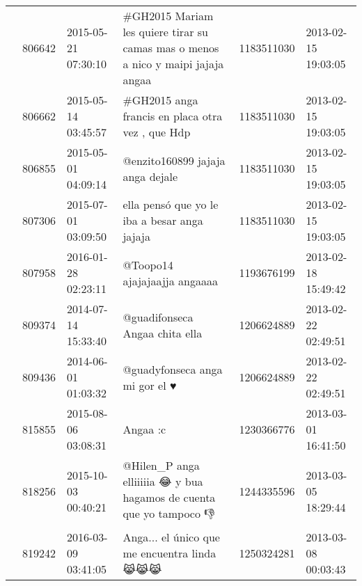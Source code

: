 \begin{tabular}{llllrl}
           & 806642  & 2015-05-21 07:30:10 &                                                             \#GH2015 Mariam les quiere tirar su camas mas o menos a nico y maipi jajaja angaa &  1183511030 & 2013-02-15 19:03:05 \\
           & 806662  & 2015-05-14 03:45:57 &                                                                                             \#GH2015 anga francis en placa otra vez , que Hdp &  1183511030 & 2013-02-15 19:03:05 \\
           & 806855  & 2015-05-01 04:09:14 &                                                                                                             @enzito160899 jajaja anga dejale &  1183511030 & 2013-02-15 19:03:05 \\
           & 807306  & 2015-07-01 03:09:50 &                                                                                                 ella pensó que yo le iba a besar anga jajaja &  1183511030 & 2013-02-15 19:03:05 \\
           & 807958  & 2016-01-28 02:23:11 &                                                                                                                 @Toopo14 ajajajaajja angaaaa &  1193676199 & 2013-02-18 15:49:42 \\
           & 809374  & 2014-07-14 15:33:40 &                                                                                                               @guadifonseca Angaa chita ella &  1206624889 & 2013-02-22 02:49:51 \\
           & 809436  & 2014-06-01 01:03:32 &                                                                                                               @guadyfonseca anga mi gor el ♥ &  1206624889 & 2013-02-22 02:49:51 \\
           & 815855  & 2015-08-06 03:08:31 &                                                                                                                                     Angaa :c &  1230366776 & 2013-03-01 16:41:50 \\
           & 818256  & 2015-10-03 00:40:21 &                                                                           @Hilen\_P anga elliiiiia 😂 y bua hagamos de cuenta que yo tampoco 👎 &  1244335596 & 2013-03-05 18:29:44 \\
           & 819242  & 2016-03-09 03:41:05 &                                                                                                  Anga...  el único que me encuentra linda😹😹😹 &  1250324281 & 2013-03-08 00:03:43 \\

\end{tabular}
